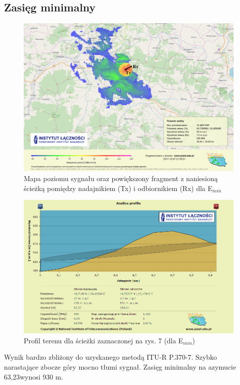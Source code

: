 \documentclass[12pt, a4paper, oneside]{article}
\begin{document}
\subsection{Zasięg minimalny}
\begin{figure}[h!]
\centering
\includegraphics[scale=0.45]{pics/piast/f2.png}
\caption{Mapa poziomu sygnału oraz powiększony fragment z naniesioną ścieżką pomiędzy nadajnikiem (Tx) i odbiornikiem (Rx) dla E$_{min}$}
\end{figure}
\begin{figure}[h!]
\centering
\includegraphics[scale=0.45]{pics/piast/f4.png}
\caption{Profil terenu dla ścieżki zaznaczonej na rys. 7 (dla E$_{min}$)}
\end{figure}
Wynik bardzo zbliżony do uzyskanego metodą ITU-R P.370-7. Szybko narastające zbocze góry mocno tłumi sygnał. Zasięg minimalny na azymucie 63,23\textdegree wynosi 930 m.
\clearpage
\end{document}
